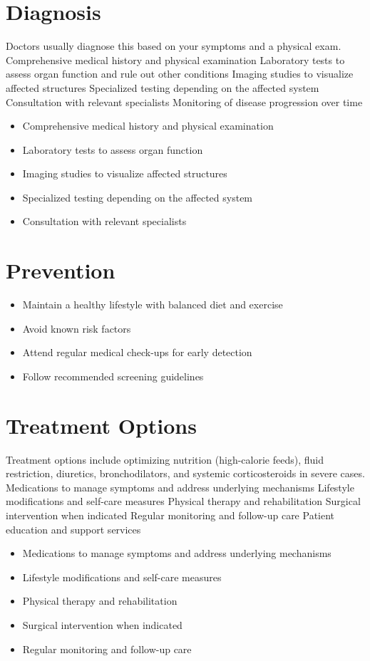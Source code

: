 \section{Diagnosis}
Doctors usually diagnose this based on your symptoms and a physical exam. Comprehensive medical history and physical examination Laboratory tests to assess organ function and rule out other conditions Imaging studies to visualize affected structures Specialized testing depending on the affected system Consultation with relevant specialists Monitoring of disease progression over time

\begin{itemize}[noitemsep]
  \item Comprehensive medical history and physical examination
  \item Laboratory tests to assess organ function
  \item Imaging studies to visualize affected structures
  \item Specialized testing depending on the affected system
  \item Consultation with relevant specialists
\end{itemize}
\section{Prevention}
\begin{itemize}[noitemsep]
  \item Maintain a healthy lifestyle with balanced diet and exercise
  \item Avoid known risk factors
  \item Attend regular medical check-ups for early detection
  \item Follow recommended screening guidelines
\end{itemize}
\section{Treatment Options}
Treatment options include optimizing nutrition (high-calorie feeds), fluid restriction, diuretics, bronchodilators, and systemic corticosteroids in severe cases. Medications to manage symptoms and address underlying mechanisms Lifestyle modifications and self-care measures Physical therapy and rehabilitation Surgical intervention when indicated Regular monitoring and follow-up care Patient education and support services

\begin{itemize}[noitemsep]
  \item Medications to manage symptoms and address underlying mechanisms
  \item Lifestyle modifications and self-care measures
  \item Physical therapy and rehabilitation
  \item Surgical intervention when indicated
  \item Regular monitoring and follow-up care
\end{itemize}
